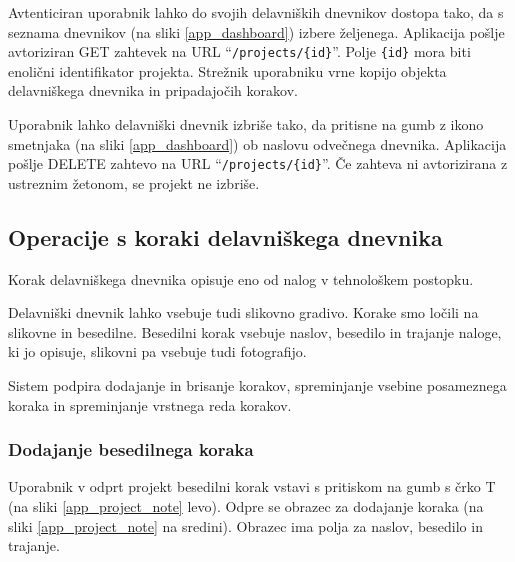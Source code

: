 \documentclass[a4paper, 12pt]{book}
\begin{document}
Avtenticiran uporabnik lahko do svojih delavniških dnevnikov dostopa tako, da s seznama dnevnikov (na sliki \ref{app_dashboard}) izbere željenega.
Aplikacija pošlje avtoriziran GET zahtevek na URL \enquote{\texttt{/projects/\{id\}}}.
Polje \texttt{\{id\}} mora biti enolični identifikator projekta.
Strežnik uporabniku vrne kopijo objekta delavniškega dnevnika in pripadajočih korakov.


Uporabnik lahko delavniški dnevnik izbriše tako, da pritisne na gumb z ikono smetnjaka (na sliki \ref{app_dashboard}) ob naslovu odvečnega dnevnika.
Aplikacija pošlje DELETE zahtevo na URL \enquote{\texttt{/projects/\{id\}}}.
Če zahteva ni avtorizirana z ustreznim žetonom, se projekt ne izbriše.



\subsection{Operacije s koraki delavniškega dnevnika}

Korak delavniškega dnevnika opisuje eno od nalog v tehnološkem postopku.

Delavniški dnevnik lahko vsebuje tudi slikovno gradivo.
Korake smo ločili na slikovne in besedilne.
Besedilni korak vsebuje naslov, besedilo in trajanje naloge, ki jo opisuje, slikovni pa vsebuje tudi fotografijo.

Sistem podpira dodajanje in brisanje korakov, spreminjanje vsebine posameznega koraka in spreminjanje vrstnega reda korakov.


\subsubsection{Dodajanje besedilnega koraka}

Uporabnik v odprt projekt besedilni korak vstavi s pritiskom na gumb s črko T (na sliki \ref{app_project_note} levo).
Odpre se obrazec za dodajanje koraka (na sliki \ref{app_project_note} na sredini).
Obrazec ima polja za naslov, besedilo in trajanje.
\end{document}
